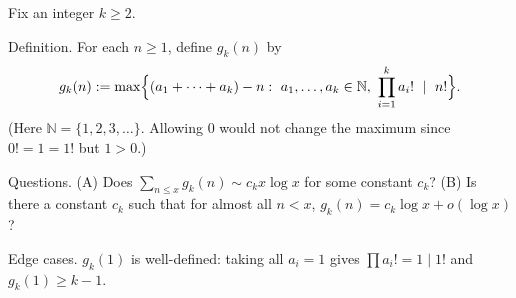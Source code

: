 Fix an integer $k\ge 2$.

Definition.
For each $n\ge 1$, define $g_k(n)$ by
\[
 g_k(n):=\max\Bigl\{ (a_1+\cdots+a_k)-n:\ a_1,\dots,a_k\in\mathbb N,\ \prod_{i=1}^k a_i!\ \mid\ n!\Bigr\}.
\]
(Here $\mathbb N=\{1,2,3,\dots\}$. Allowing $0$ would not change the maximum since $0!=1=1!$ but $1>0$.)

Questions.
(A) Does $\sum_{n\le x} g_k(n)\sim c_k x\log x$ for some constant $c_k$?
(B) Is there a constant $c_k$ such that for almost all $n<x$, $g_k(n)=c_k\log x+o(\log x)$?

Edge cases.
$g_k(1)$ is well-defined: taking all $a_i=1$ gives $\prod a_i!=1\mid 1!$ and $g_k(1)\ge k-1$.

